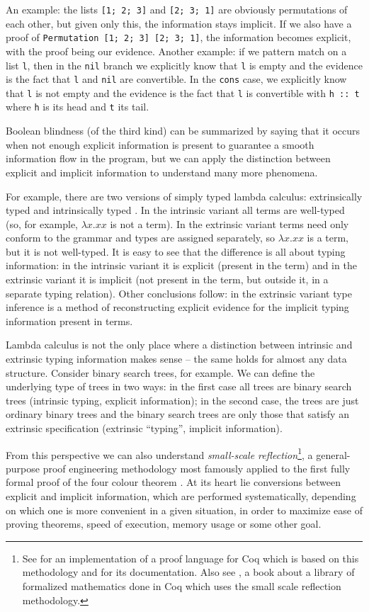 \documentclass[declaration,mgr,english,shortabstract]{iithesis}
\newcommand{\m}[1]{\texttt{#1}}
\begin{document}
An example: the lists \m{[1; 2; 3]} and \m{[2; 3; 1]} are obviously permutations of each other, but given only this, the information stays implicit. If we also have a proof of \m{Permutation [1; 2; 3] [2; 3; 1]}, the information becomes explicit, with the proof being our evidence. Another example: if we pattern match on a list \m{l}, then in the \m{nil} branch we explicitly know that \m{l} is empty and the evidence is the fact that \m{l} and \m{nil} are convertible. In the \m{cons} case, we explicitly know that \m{l} is not empty and the evidence is the fact that \m{l} is convertible with \m{h\ ::\ t} where \m{h} is its head and \m{t} its tail.

Boolean blindness (of the third kind) can be summarized by saying that it occurs when not enough explicit information is present to guarantee a smooth information flow in the program, but we can apply the distinction between explicit and implicit information to understand many more phenomena.

For example, there are two versions of simply typed lambda calculus: extrinsically typed and intrinsically typed \cite{IntrinsicExtrinsic}. In the intrinsic variant all terms are well-typed (so, for example, $\lambda x.xx$ is not a term). In the extrinsic variant terms need only conform to the grammar and types are assigned separately, so $\lambda x.xx$ is a term, but it is not well-typed. It is easy to see that the difference is all about typing information: in the intrinsic variant it is explicit (present in the term) and in the extrinsic variant it is implicit (not present in the term, but outside it, in a separate typing relation). Other conclusions follow: in the extrinsic variant type inference is a method of reconstructing explicit evidence for the implicit typing information present in terms.

Lambda calculus is not the only place where a distinction between intrinsic and extrinsic typing information makes sense -- the same holds for almost any data structure. Consider binary search trees, for example. We can define the underlying type of trees in two ways: in the first case all trees are binary search trees (intrinsic typing, explicit information); in the second case, the trees are just ordinary binary trees and the binary search trees are only those that satisfy an extrinsic specification (extrinsic ``typing'', implicit information).

From this perspective we can also understand \textit{small-scale reflection}\footnote{See \cite{SSR1} for an implementation of a proof language for Coq which is based on this methodology and \cite{SSR2} for its documentation. Also see \cite{MCB}, a book about a library of formalized mathematics done in Coq which uses the small scale reflection methodology.}, a general-purpose proof engineering methodology most famously applied to the first fully formal proof of the four colour theorem \cite{4CT1} \cite{4CT2}. At its heart lie conversions between explicit and implicit information, which are performed systematically, depending on which one is more convenient in a given situation, in order to maximize ease of proving theorems, speed of execution, memory usage or some other goal.
\end{document}

